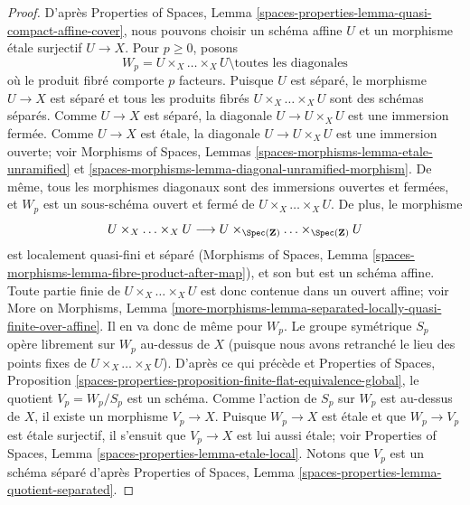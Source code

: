 \begin{proof}
D'après Properties of Spaces, Lemma
\ref{spaces-properties-lemma-quasi-compact-affine-cover},
nous pouvons choisir un schéma affine $U$ et un morphisme étale surjectif
$U \to X$. Pour $p \geq 0$, posons
$$
W_p = U \times_X \ldots \times_X U \setminus
\text{toutes les diagonales}
$$
où le produit fibré comporte $p$ facteurs. Puisque $U$ est séparé,
le morphisme $U \to X$ est séparé et tous les produits fibrés
$U \times_X \ldots \times_X U$ sont des schémas séparés. Comme $U \to X$
est séparé, la diagonale $U \to U \times_X U$ est une immersion fermée.
Comme $U \to X$ est étale, la diagonale $U \to U \times_X U$ est une
immersion ouverte; voir Morphisms of Spaces, Lemmas
\ref{spaces-morphisms-lemma-etale-unramified} et
\ref{spaces-morphisms-lemma-diagonal-unramified-morphism}.
De même, tous les morphismes diagonaux sont des immersions ouvertes et
fermées, et $W_p$ est un sous-schéma ouvert et fermé de
$U \times_X \ldots \times_X U$. De plus, le morphisme
$$
U \times_X \ldots \times_X U \longrightarrow
U \times_{\Spec(\mathbf{Z})} \ldots \times_{\Spec(\mathbf{Z})} U
$$
est localement quasi-fini et séparé (Morphisms of Spaces,
Lemma \ref{spaces-morphisms-lemma-fibre-product-after-map}),
et son but est un schéma affine. Toute partie finie de
$U \times_X \ldots \times_X U$ est donc contenue dans un ouvert affine;
voir More on Morphisms, Lemma
\ref{more-morphisms-lemma-separated-locally-quasi-finite-over-affine}.
Il en va donc de même pour $W_p$.
Le groupe symétrique $S_p$ opère librement sur $W_p$ au-dessus de $X$
(puisque nous avons retranché le lieu des points fixes de
$U \times_X \ldots \times_X U$). D'après ce qui précède et
Properties of Spaces, Proposition
\ref{spaces-properties-proposition-finite-flat-equivalence-global},
le quotient $V_p = W_p/S_p$ est un schéma. Comme l'action de $S_p$ sur
$W_p$ est au-dessus de $X$, il existe un morphisme $V_p \to X$.
Puisque $W_p \to X$ est étale et que $W_p \to V_p$ est étale surjectif,
il s'ensuit que $V_p \to X$ est lui aussi étale; voir
Properties of Spaces, Lemma \ref{spaces-properties-lemma-etale-local}.
Notons que $V_p$ est un schéma séparé d'après
Properties of Spaces, Lemma
\ref{spaces-properties-lemma-quotient-separated}.


\end{proof}
